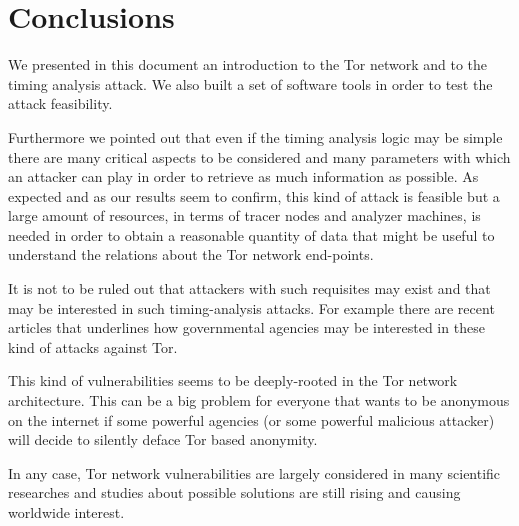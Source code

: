\section{Conclusions}
We presented in this document an introduction to the Tor network and to
the timing analysis attack. We also built a set of software tools in order
to test the attack feasibility. 

Furthermore we pointed out that even if the timing analysis logic may be simple there are many critical
aspects to be considered and many parameters with which an attacker can
play in order to retrieve as much information as possible. As expected
and as our
results seem to confirm, this kind of attack is feasible but a large
amount of resources, in terms of tracer nodes and analyzer machines, 
is needed in order to obtain a reasonable quantity of data that might be useful to
understand the relations about the Tor network end-points. 

It is not to
be ruled out that attackers with such requisites may exist and that may be
interested in such timing-analysis attacks. For example there are recent
articles\cite{vantor}\cite{schneier2013attacking} that underlines how
governmental agencies may be interested in
these kind of attacks against Tor.  

This kind of vulnerabilities seems to be deeply-rooted in the Tor network architecture.
This can be a big problem for everyone that wants to be anonymous on the internet if
some powerful agencies (or some powerful malicious attacker) will decide to
silently deface Tor based anonymity.

In any case, Tor network vulnerabilities are largely considered in many
scientific researches and studies about possible solutions are still
rising and causing worldwide interest.

